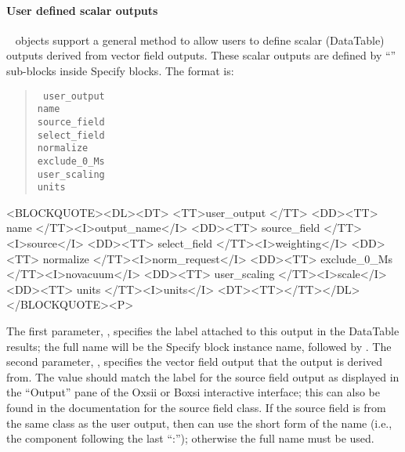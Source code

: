 \paragraph{User defined scalar outputs}%
\label{par:userScalarOutputs}
\OOMMF\  objects support a general method to allow users to
define scalar (DataTable) outputs derived from vector field outputs.
These scalar outputs are defined by ``'' sub-blocks inside
Specify blocks.  The format is:
      \begin{latexonly}
      \begin{quote}\tt
      user\_output \ocb\\
       \bi name \\
       \bi source\_field \\
       \bi select\_field \\
       \bi normalize \\
       \bi exclude\_0\_Ms \\
       \bi user\_scaling \\
       \bi units \\
      \ccb
      \end{quote}
      \end{latexonly}
      \begin{rawhtml}<BLOCKQUOTE><DL><DT>
      <TT>user_output {</TT>
      <DD><TT> name </TT><I>output_name</I>
      <DD><TT> source_field </TT><I>source</I>
      <DD><TT> select_field </TT><I>weighting</I>
      <DD><TT> normalize </TT><I>norm_request</I>
      <DD><TT> exclude_0_Ms </TT><I>novacuum</I>
      <DD><TT> user_scaling </TT><I>scale</I>
      <DD><TT> units </TT><I>units</I>
      <DT><TT>}</TT></DL></BLOCKQUOTE><P>
      \end{rawhtml}
The first parameter, , specifies the label attached to
this output in the DataTable results; the full name will be the Specify
block instance name, followed by .  The second
parameter, , specifies the vector field output
that the output is derived from.  The  value should
match the label for the source field output as displayed in the ``Output'' pane
of the Oxsii or Boxsi interactive interface; this can also be found in the
documentation for the source field  class.  If the source
field is from the same class as the user output, then 
can use the short form of the name (i.e., the component following the
last ``:''); otherwise the full name must be used.


